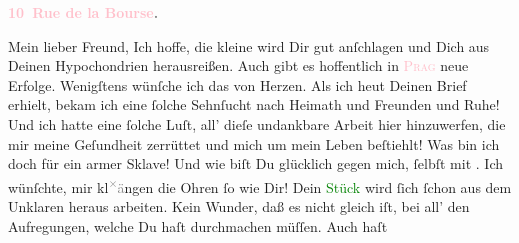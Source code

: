            \pstart
           \begin{otherlanguage}{french}\textcolor{gray}{\textbf{\textbf{\textcolor{pink}{10 Rue de la Bourse}{}\ledrightnote{\textcolor{pink}{rue de la Bourse}}.}}}\end{otherlanguage}\pend
           \pstart\center{}Mein lieber Freund,\pend\pstart
           Ich hoffe, die kleine \label{K_L02832-1v}\label{K_L02832-1h} wird Dir gut
               anſchlagen und Dich aus Deinen Hypochondrien herausreißen. Auch gibt es hoffentlich
               in \textsc{\textcolor{pink}{Prag}{}\ledrightnote{\textcolor{pink}{Prag}}} neue Erfolge. Wenigſtens wünſche ich das von Herzen.\pend
           \pstart
           Als ich heut Deinen Brief erhielt, bekam ich eine  ſolche Sehnſucht nach Heimath und Freunden und Ruhe! Und ich hatte eine ſolche
               Luſt, all’ dieſe undankbare Arbeit hier hinzuwerfen, die mir meine Geſundheit
               zerrüttet und mich um mein Leben beſtiehlt!\pend
           \pstart
           {\pb}Was bin ich doch für ein armer Sklave! Und wie biſt
               Du glücklich gegen mich, ſelbſt mit \label{K_L02832-3v}\label{K_L02832-3h}. Ich wünſchte, mir kl\substVorne{}\textsuperscript{\textcolor{gray}{×}}\substDazwischen{}\textcolor{gray}{ä}\substHinten{}ngen die Ohren ſo wie Dir!\pend
           \pstart
           Dein \textcolor{green}{Stück}{} wird ſich ſchon aus
               dem Unklaren heraus arbeiten. Kein Wunder, daß es nicht gleich \label{K_L02832-5v}\label{K_L02832-5h} iſt, bei all’ den Aufregungen, welche Du haſt durchmachen müſſen. Auch haſt

